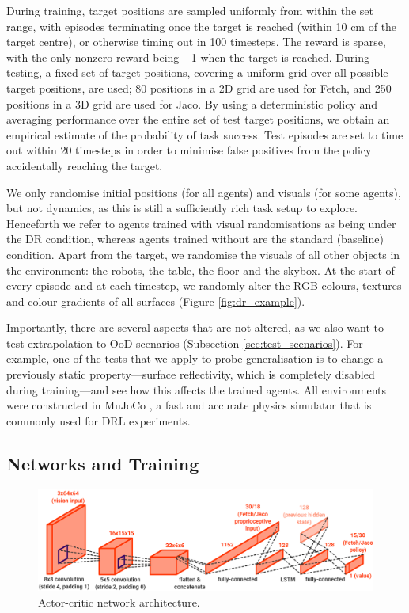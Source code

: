 During training, target positions are sampled uniformly from within the
set range, with episodes terminating once the target is reached (within
10 cm of the target centre), or otherwise timing out in 100 timesteps.
The reward is sparse, with the only nonzero reward being +1 when the
target is reached. During testing, a fixed set of target positions,
covering a uniform grid over all possible target positions, are used; 80
positions in a 2D grid are used for Fetch, and 250 positions in a 3D
grid are used for Jaco. By using a deterministic policy and averaging
performance over the entire set of test target positions, we obtain an
empirical estimate of the probability of task success. Test episodes are
set to time out within 20 timesteps in order to minimise false positives
from the policy accidentally reaching the target.

We only randomise initial positions (for all agents) and visuals (for
some agents), but not dynamics, as this is still a sufficiently rich
task setup to explore. Henceforth we refer to agents trained with visual
randomisations as being under the DR condition, whereas agents trained
without are the standard (baseline) condition. Apart from the target, we
randomise the visuals of all other objects in the environment: the
robots, the table, the floor and the skybox. At the start of every
episode and at each timestep, we randomly alter the RGB colours,
textures and colour gradients of all surfaces (Figure
\ref{fig:dr_example}).

Importantly, there are several aspects that are not altered, as we also
want to test extrapolation to OoD scenarios (Subsection
\ref{sec:test_scenarios}). For example, one of the tests that we apply
to probe generalisation is to change a previously static
property---surface reflectivity, which is completely disabled during
training---and see how this affects the trained agents. All environments
were constructed in MuJoCo \cite{todorov2012mujoco}, a fast and
accurate physics simulator that is commonly used for DRL experiments.

\hypertarget{networks-and-training}{%
\subsection{Networks and Training}\label{networks-and-training}}

\label{sec:networks_training}

\begin{figure}
  \centering
  \includegraphics[width=0.85\linewidth]{figures/chapter6/network.png}
  \caption{Actor-critic network architecture.}
  \label{fig:network}
\end{figure}

